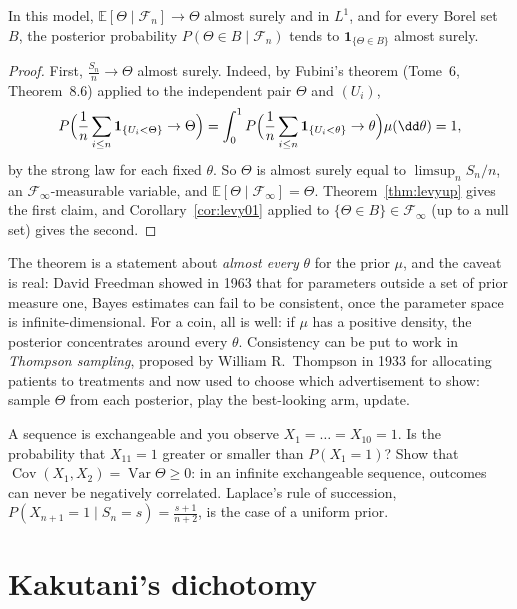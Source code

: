 \begin{theorem}[Doob, 1949]\label{thm:doobconsistency}
In this model, $\mathbb E[\Theta\mid\mathcal F_n]\to\Theta$ almost surely and in $L^1$, and for every Borel set $B$, the posterior probability $P(\Theta\in B\mid\mathcal F_n)$ tends to $\mathbf 1_{\{\Theta\in B\}}$ almost surely.
\end{theorem}
\begin{proof}
First, $\frac{S_n}n\to\Theta$ almost surely. Indeed, by Fubini's theorem (Tome~6, Theorem~8.6) applied to the independent pair $\Theta$ and $(U_i)$,
\[
P\Bigl(\frac1n\sum_{i\le n}\mathbf 1_{\{U_i<\Theta\}}\to\Theta\Bigr)=\int_0^1P\Bigl(\frac1n\sum_{i\le n}\mathbf 1_{\{U_i<\theta\}}\to\theta\Bigr)\mu(\dd\theta)=1,
\]
by the strong law for each fixed $\theta$. So $\Theta$ is almost surely equal to $\limsup_nS_n/n$, an $\mathcal F_\infty$-measurable variable, and $\mathbb E[\Theta\mid\mathcal F_\infty]=\Theta$. Theorem~\ref{thm:levyup} gives
the first claim, and Corollary~\ref{cor:levy01} applied to $\{\Theta\in B\}\in\mathcal F_\infty$ (up to a null set) gives the second.
\end{proof}

The theorem is a statement about \emph{almost every} $\theta$ for the prior $\mu$, and the caveat is real: David Freedman showed in 1963 that for parameters outside a set of prior measure one,
Bayes estimates can fail to be consistent, once the parameter space is infinite-dimensional. For a coin, all is well: if $\mu$ has a positive density, the posterior concentrates around every $\theta$.
Consistency can be put to work in \emph{Thompson sampling}, proposed by William R.\ Thompson in 1933 for allocating patients to treatments and now used to choose which advertisement to
show: sample $\Theta$ from each posterior, play the best-looking arm, update.

\begin{think}
A sequence is exchangeable and you observe $X_1=\dots=X_{10}=1$. Is the probability that $X_{11}=1$ greater or smaller than $P(X_1=1)$? Show that $\operatorname{Cov}(X_1,X_2)=\operatorname{Var}\Theta\ge0$:
in an infinite exchangeable sequence, outcomes can never be negatively correlated. Laplace's rule of succession, $P(X_{n+1}=1\mid S_n=s)=\frac{s+1}{n+2}$, is the case of a uniform prior.
\end{think}

\section{Kakutani's dichotomy}

